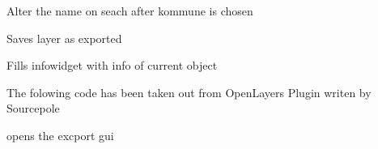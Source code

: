 \documentclass[letterpaper,10pt,english]{sphinxmanual}
\begin{document}
\begin{fulllineitems}
\begin{fulllineitems}
\label{\detokenize{code:Tilgjengelighet.Tilgjengelighet.komune_valgt}}
Alter the name on seach after kommune is chosen

\end{fulllineitems}


\begin{fulllineitems}
\label{\detokenize{code:Tilgjengelighet.Tilgjengelighet.lagre_lag}}
Saves layer as exported

\end{fulllineitems}


\begin{fulllineitems}
\label{\detokenize{code:Tilgjengelighet.Tilgjengelighet.obj_info}}
Fills infowidget with info of current object

\end{fulllineitems}


\begin{fulllineitems}
\label{\detokenize{code:Tilgjengelighet.Tilgjengelighet.openLayer_background_init}}
The folowing code has been taken out from OpenLayers Plugin writen by Sourcepole

\end{fulllineitems}


\begin{fulllineitems}
\label{\detokenize{code:Tilgjengelighet.Tilgjengelighet.open_export_layer_dialog}}
opens the excport gui

\end{fulllineitems}



\end{fulllineitems}
\end{document}
